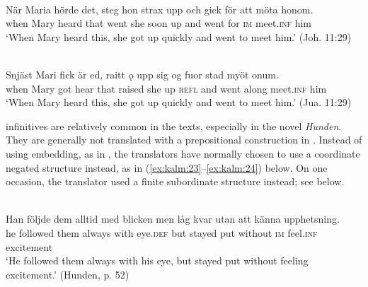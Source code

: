 \documentclass[output=paper]{langscibook}
\begin{document}
\ea
\label{ex:kalm:22}
\ea {}\label{ex:kalm:22a}\\
\gll När Maria hörde det, steg hon strax upp och gick för att möta honom.\\
when Mary heard that went she soon up and went for \textsc{im} meet.\textsc{inf} him\\
\glt ‘When Mary heard this, she got up quickly and went to meet him.’ (Joh. 11:29)

\ex {}\label{ex:kalm:22b}\\ 
\gll Snjäst Mari fick är ed, raitt ǫ upp sig og fuor stad myöt onum.\\
when Mary got hear that raised she up \textsc{refl} and went along meet.\textsc{inf} him\\
\glt ‘When Mary heard this, she got up quickly and went to meet him.’ (Jua. 11:29)
\z 
\z 


 infinitives are relatively common in the  texts, especially in the novel \textit{Hunden}. They are generally not translated with a prepositional construction in . Instead of using embedding, as in , the  translators have normally chosen to use a coordinate negated structure instead, as in (\ref{ex:kalm:23}--\ref{ex:kalm:24}) below. On one occasion, the translator used a finite subordinate structure instead; see  below.\largerpage[-1]


\ea
\label{ex:kalm:23}
\ea {}\label{ex:kalm:23a}\\
\gll Han följde dem alltid med blicken men låg kvar utan att känna upphetsning.\\
he followed them always with eye.\textsc{def} but stayed put without \textsc{im} feel.\textsc{inf} excitement\\
\glt ‘He followed them always with his eye, but stayed put without feeling excitement.’ (Hunden, p. 52)\\
\end{document}
